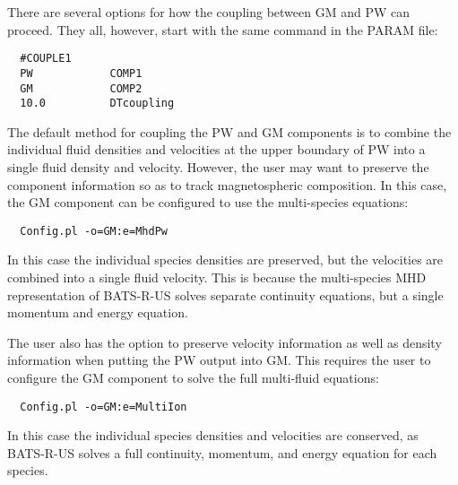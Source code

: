 There are several options for how the coupling between GM and PW can proceed. 
They all, however, start with the same command in the PARAM file:
\begin{verbatim}
  #COUPLE1
  PW            COMP1
  GM            COMP2
  10.0          DTcoupling
\end{verbatim}
The default method for coupling the PW and GM components is to combine the 
individual fluid densities and velocities at the upper boundary of PW into 
a single fluid density and velocity. However, the user may want to 
preserve the component information so as to track magnetospheric 
composition. In this case, the GM component can be configured to 
use the multi-species equations:
\begin{verbatim}
  Config.pl -o=GM:e=MhdPw
\end{verbatim}
In this case the individual species densities are preserved, but the 
velocities are combined into a single fluid velocity. This is because the 
multi-species MHD representation of BATS-R-US solves separate continuity 
equations, but a single momentum and energy equation. 

The user also has the option to preserve velocity information as well as 
density information when putting the PW output into GM. This requires the 
user to configure the GM component to solve the full multi-fluid 
equations:
\begin{verbatim}
  Config.pl -o=GM:e=MultiIon
\end{verbatim}
In this case the individual species densities and velocities are conserved, as 
BATS-R-US solves a full continuity, momentum, and energy equation for each 
species.

